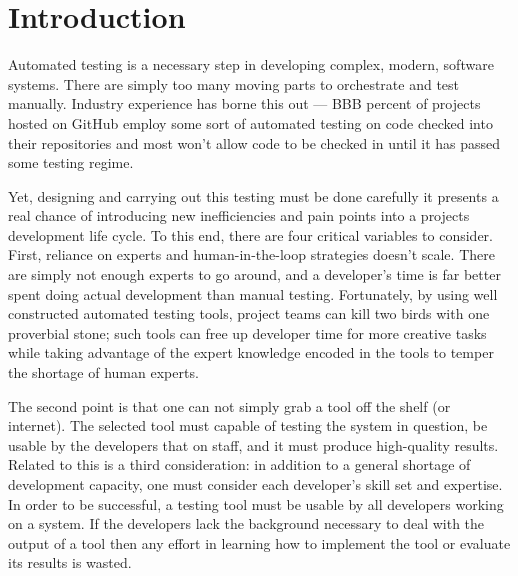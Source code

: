 \section{Introduction}
\label{SEC:introduction}


 Automated testing
is a necessary step in developing complex, modern, software systems.  There
are simply too many moving parts to orchestrate and test manually.
Industry experience has borne this out --- BBB percent of projects hosted
on GitHub employ some sort of automated testing on code checked into their
repositories and most won't allow code to be checked in until it has passed
some testing regime.

Yet, designing and carrying out this testing must be done carefully it
presents a real chance of introducing new inefficiencies and pain points
into a projects development life cycle.  To this end, there are four
critical variables to consider.  First, reliance on experts and
human-in-the-loop strategies doesn't scale.  There are
simply not enough experts to go around, and a developer's time is far
better spent doing actual development than manual testing.  Fortunately, by using well constructed automated
testing tools, project teams can kill two birds with one proverbial stone;
such tools can free up developer time for more creative tasks while taking
advantage of the expert knowledge encoded in the tools to temper the
shortage of human experts.


The second point is that one can not simply grab a tool off the shelf (or
internet).  The selected tool must capable of testing the system in
question, be usable by the developers that on staff, and it must produce
high-quality results.  Related to this is a third consideration: in
addition to a general shortage of development capacity, one must consider
each developer’s skill set and expertise. In order to be successful, a
testing tool must be usable by all developers working on a system. If the
developers lack the background necessary to deal with the output of a tool
then any effort in learning how to implement the tool or  evaluate its
results is wasted.

